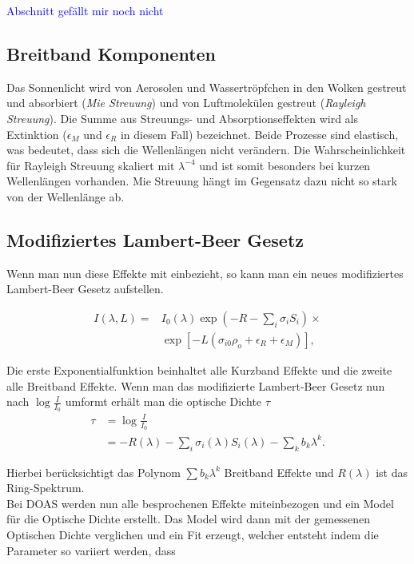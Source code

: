 \documentclass[12pt, a4paper, bibliography=totoc]{scrartcl}
\begin{document}
\begin{multicols}{2}
\textcolor{blue}{Abschnitt gefällt mir noch nicht}

\subsection{Breitband Komponenten}

Das Sonnenlicht wird von Aerosolen und Wassertröpfchen in den Wolken gestreut und absorbiert (\textit{Mie Streuung}) und von Luftmolekülen gestreut (\textit{Rayleigh Streuung}).
Die Summe aus Streuungs- und Absorptionseffekten wird als Extinktion ($\epsilon_M$ und $\epsilon_R$ in diesem Fall) bezeichnet.
Beide Prozesse sind elastisch, was bedeutet, dass sich die Wellenlängen nicht verändern.
Die Wahrscheinlichkeit für Rayleigh Streuung skaliert mit $\lambda^{-4}$ und ist somit besonders bei kurzen Wellenlängen vorhanden.
Mie Streuung hängt im Gegensatz dazu nicht so stark von der Wellenlänge ab.

\subsection{Modifiziertes Lambert-Beer Gesetz}\label{ssec:mod_lamb-beer_law}

Wenn man nun diese Effekte mit einbezieht, so kann man ein neues modifiziertes Lambert-Beer Gesetz aufstellen.

\begin{align*}
    I(\lambda, L) = & I_0 (\lambda) \exp \left( -R - \sum_i \sigma_i
    S_i \right) \times \\
    & \exp \left[ - L \left( \sigma_{i0} \rho_o + \epsilon_R + \epsilon_M \right) \right], \label{eq:mod_lambert_beer_law}
\end{align*}

Die erste Exponentialfunktion beinhaltet alle Kurzband Effekte und die zweite alle Breitband Effekte.
Wenn man das modifizierte Lambert-Beer Gesetz nun nach $\log \frac{I}{I_0}$ umformt erhält man die optische Dichte $\tau$
\begin{align}
\tau &= \log \frac{I}{I_0} \\
    &= - R(\lambda) - \sum_i \sigma_i (\lambda) S_i (\lambda) - \sum_k b_k \lambda^k.\label{eq:optical_density}
\end{align}

Hierbei berücksichtigt das Polynom $\sum b_k \lambda^k$ Breitband Effekte und $R(\lambda)$ ist das Ring-Spektrum.\\
Bei DOAS werden nun alle besprochenen Effekte miteinbezogen und ein Model für die Optische Dichte erstellt. 
Das Model wird dann mit der gemessenen Optischen Dichte verglichen und ein Fit erzeugt, welcher entsteht indem die Parameter so variiert werden, dass 


\end{multicols}
\end{document}
